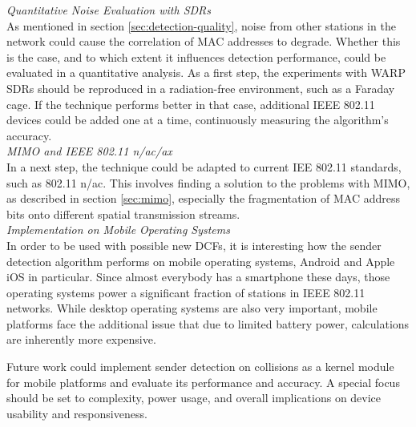\textit{Quantitative Noise Evaluation with SDRs}\\

As mentioned in section \ref{sec:detection-quality}, noise from other stations in the network could cause the correlation of MAC addresses to degrade. Whether this is the case, and to which extent it influences detection performance, could be evaluated in a quantitative analysis. As a first step, the experiments with \gls{WARP} \glspl{SDR} should be reproduced in a radiation-free environment, such as a Faraday cage. If the technique performs better in that case, additional IEEE 802.11 devices could be added one at a time, continuously measuring the algorithm's accuracy.\\

\textit{MIMO and IEEE 802.11 n/ac/ax}\\

In a next step, the technique could be adapted to current IEE 802.11 standards, such as 802.11 n/ac. This involves finding a solution to the problems with \gls{MIMO}, as described in section \ref{sec:mimo}, especially the fragmentation of MAC address bits onto different spatial transmission streams.\\

\textit{Implementation on Mobile Operating Systems}\\

In order to be used with possible new \glspl{DCF}, it is interesting how the sender detection algorithm performs on mobile operating systems, Android and Apple iOS in particular. Since almost everybody has a smartphone these days, those operating systems power a significant fraction of stations in IEEE 802.11 networks. While desktop operating systems are also very important, mobile platforms face the additional issue that due to limited battery power, calculations are inherently more expensive.

Future work could implement sender detection on collisions as a kernel module for mobile platforms and evaluate its performance and accuracy. A special focus should be set to complexity, power usage, and overall implications on device usability and responsiveness.
